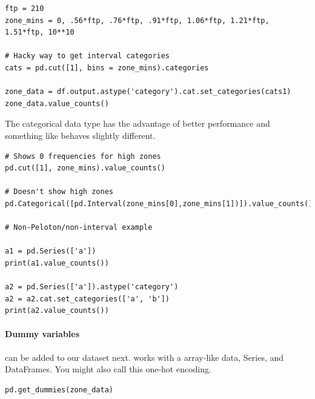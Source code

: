 \begin{lstlisting}
ftp = 210
zone_mins = 0, .56*ftp, .76*ftp, .91*ftp, 1.06*ftp, 1.21*ftp, 1.51*ftp, 10**10

# Hacky way to get interval categories
cats = pd.cut([1], bins = zone_mins).categories

zone_data = df.output.astype('category').cat.set_categories(cats1)
zone_data.value_counts()
\end{lstlisting}

The categorical data type has the advantage of better performance and something like  behaves slightly different. 

\begin{lstlisting}
# Shows 0 frequencies for high zones
pd.cut([1], zone_mins).value_counts()

# Doesn't show high zones
pd.Categorical([pd.Interval(zone_mins[0],zone_mins[1])]).value_counts()

# Non-Peloton/non-interval example

a1 = pd.Series(['a'])
print(a1.value_counts())

a2 = pd.Series(['a']).astype('category')
a2 = a2.cat.set_categories(['a', 'b'])
print(a2.value_counts())
\end{lstlisting}



\paragraph{Dummy variables} can be added to our dataset next.  works with a array-like data, Series, and DataFrames. You might also call this one-hot encoding. 

\begin{lstlisting}
pd.get_dummies(zone_data)
\end{lstlisting}


